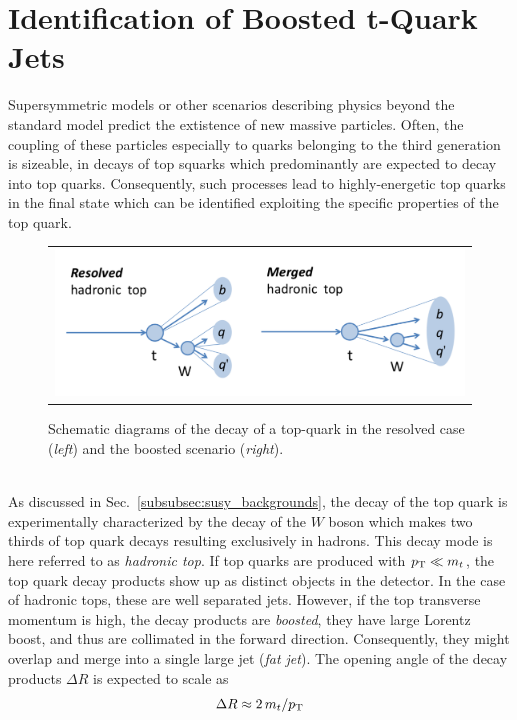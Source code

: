\section{Identification of Boosted t-Quark Jets }
\label{sec:boosted_tops}
Supersymmetric models or other scenarios describing physics beyond the standard model predict the extistence of new massive particles. Often, the coupling of these particles especially to quarks belonging to the third generation is sizeable, \eg in decays of top squarks which predominantly are expected to decay into top quarks. Consequently, such processes lead to highly-energetic top quarks in the final state which can be identified exploiting the specific properties of the top quark. 
\begin{figure}[!tp]
  \centering 
  \begin{tabular}{c}
    \includegraphics[width=1.0\textwidth]{figures/BoostedTops2.pdf} 
  \end{tabular}
  \caption{Schematic diagrams of the decay of a top-quark in the resolved case (\textit{left}) and the boosted scenario (\textit{right}).}
  \label{fig:boosted_top}
\end{figure}
\\
As discussed in Sec.~\ref{subsubsec:susy_backgrounds}, the decay of the top quark is experimentally characterized by the decay of the $W$ boson which makes two thirds of top quark decays resulting exclusively in hadrons. This decay mode is here referred to as \textit{hadronic top}. If top quarks are produced with $p_{\text{T}} \ll m_t$, the top quark decay products show up as distinct objects in the detector. In the case of hadronic tops, these are well separated jets. However, if the top transverse momentum is high, the decay products are \textit{boosted}, \ie they have large Lorentz boost, and thus are collimated in the forward direction. Consequently, they might overlap and merge into a single large jet (\textit{fat jet}). The opening angle of the decay products $\Delta R$ is expected to scale as
\begin{equation}
 \Delta R \approx 2\,m_{t} /p_{\text{T}}
 \label{eq:rule-of-thumb}
\end{equation}  
